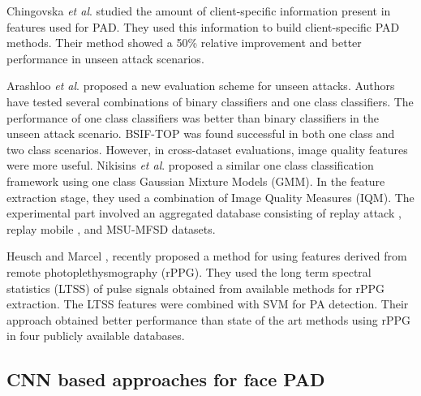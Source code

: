 \documentclass[journal]{IEEEtran}
\begin{document}
Chingovska \textit{et al}. \cite{chingovska2015use} studied the amount of client-specific information present in features used for PAD. They used this information to build client-specific PAD methods. Their method showed a 50\% relative improvement and better performance in unseen attack scenarios.

Arashloo \textit{et al}. \cite{arashloo2017anomaly} proposed a new evaluation scheme for unseen attacks. Authors have tested several combinations of binary classifiers and one class classifiers. The performance of one class classifiers was better than binary classifiers in the unseen attack scenario. BSIF-TOP was found successful in both one class and two class scenarios. However, in cross-dataset evaluations, image quality features were more useful. Nikisins \textit{et al}. \cite{nikisins2018effectiveness} proposed a similar one class classification framework using one class Gaussian Mixture Models (GMM). In the feature extraction stage, they used a combination of Image Quality Measures (IQM). The experimental part involved an aggregated database consisting of replay attack \cite{chingovska2012effectiveness}, replay mobile \cite{costa2016replay}, and MSU-MFSD \cite{wen2015face} datasets.

Heusch and Marcel \cite{Heuch2018}, \cite{heusch2019remote} recently proposed a method for using features derived from remote photoplethysmography (rPPG).
They used the long term spectral statistics (LTSS) of pulse signals obtained from available methods for rPPG extraction. The LTSS features were combined with SVM for PA detection.
Their approach obtained better performance than state of the art methods using rPPG in four publicly available databases.



\subsection{CNN based approaches for face PAD}
\end{document}
